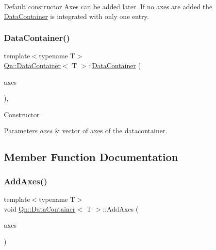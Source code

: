 Default constructor Axes can be added later. If no axes are added the \mbox{\hyperlink{classQn_1_1DataContainer}{Data\+Container}} is integrated with only one entry. \mbox{\label{classQn_1_1DataContainer_a1f171432b577b5d0061908d461c39198}} 
\subsubsection{\texorpdfstring{Data\+Container()}{DataContainer()}\hspace{0.1cm}{\footnotesize\ttfamily [2/2]}}
{\footnotesize\ttfamily template$<$typename T$>$ \\
\mbox{\hyperlink{classQn_1_1DataContainer}{Qn\+::\+Data\+Container}}$<$ T $>$\+::\mbox{\hyperlink{classQn_1_1DataContainer}{Data\+Container}} (\begin{DoxyParamCaption}\item[{std\+::vector$<$ \mbox{\hyperlink{classQn_1_1Axis}{Axis}} $>$}]{axes }\end{DoxyParamCaption})\hspace{0.3cm}{\ttfamily [inline]}, {\ttfamily [explicit]}}

Constructor 
\begin{DoxyParams}{Parameters}
{\em axes} & vector of axes of the datacontainer. \\
\hline
\end{DoxyParams}


\subsection{Member Function Documentation}
\mbox{\label{classQn_1_1DataContainer_a1e60f7b54d499b8bca9ea2a04fc55340}} 
\subsubsection{\texorpdfstring{Add\+Axes()}{AddAxes()}}
{\footnotesize\ttfamily template$<$typename T$>$ \\
void \mbox{\hyperlink{classQn_1_1DataContainer}{Qn\+::\+Data\+Container}}$<$ T $>$\+::Add\+Axes (\begin{DoxyParamCaption}\item[{const Qn\+Axes \&}]{axes }\end{DoxyParamCaption})\hspace{0.3cm}{\ttfamily [inline]}}

